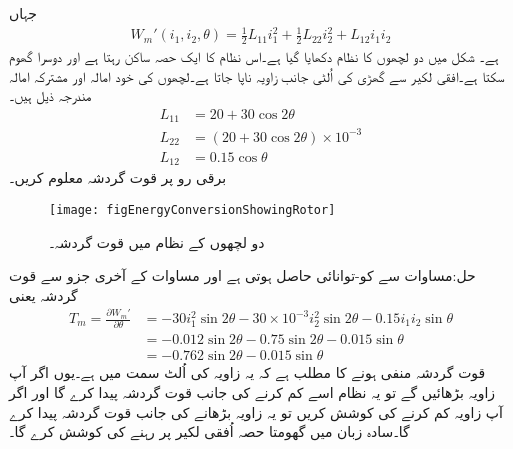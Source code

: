 جہاں
\begin{align}\label{مساوات_تبادلہ_کوتوانائی_از_خود}
W_m'(i_1,i_2,\theta)=\frac{1}{2} L_{11} i_1^2+\frac{1}{2} L_{22} i_2^2+L_{12} i_1 i_2
\end{align}
ہے۔
%
شکل   میں دو لچھوں کا نظام دکھایا گیا ہے۔اس نظام کا ایک حصہ ساکن رہتا ہے اور دوسرا گھوم سکتا ہے۔افقی لکیر سے گھڑی کی اُلٹی جانب زاویہ   ناپا جاتا ہے۔لچھوں کی خود امالہ اور مشترکہ امالہ مندرجہ ذیل ہیں۔
\begin{align*}
L_{11}&=20+30\cos 2 \theta\\
L_{22}&=\left(20+30\cos 2\theta \right) \times 10^{-3}\\
L_{12}&=0.15 \cos \theta
\end{align*}
 برقی رو   پر قوت گردشہ  معلوم کریں۔
\begin{figure}
\centering
\texttt{[image: figEnergyConversionShowingRotor]}
\caption{دو لچھوں کے نظام میں قوت گردشہ۔}
\label{شکل_تبادلہ_توانائی_دو_لچھوں_میں_مروڑ}
\end{figure}

حل:مساوات  سے کو-توانائی حاصل ہوتی ہے اور مساوات   کے آخری جزو سے قوت گردشہ یعنی
\begin{align*}
T_m=\frac{\partial W_m'}{\partial \theta}&=-30 i_1^2 \sin 2 \theta-30\times 10^{-3} i_2^2 \sin 2 \theta -0.15 i_1 i_2 \sin \theta\\
&=-0.012 \sin 2 \theta-0.75 \sin 2 \theta-0.015 \sin \theta\\
&=-0.762 \sin 2 \theta-0.015 \sin \theta
\end{align*}
قوت گردشہ منفی ہونے کا مطلب ہے کہ یہ زاویہ کی اُلٹ سمت میں ہے۔یوں اگر آپ زاویہ بڑھائیں گے تو یہ نظام اسے کم کرنے کی جانب قوت گردشہ پیدا کرے گا اور اگر آپ زاویہ کم کرنے کی کوشش کریں تو یہ زاویہ بڑھانے کی جانب قوت گردشہ پیدا کرے گا۔سادہ زبان میں گھومتا حصہ اُفقی لکیر پر رہنے کی کوشش کرے گا۔
